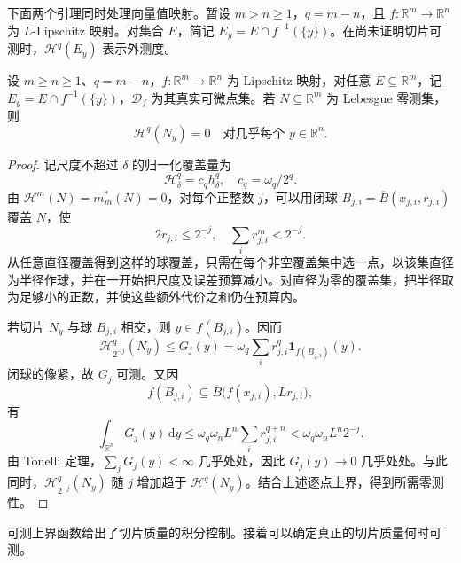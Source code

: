 \ProseParagraphBreak

下面两个引理同时处理向量值映射。暂设 \(m>n\geq1\)，\(q=m-n\)，且 \(f:\mathbb R^m\rightarrow\mathbb R^n\) 为 \(L\)-Lipschitz 映射。对集合 \(E\)，简记 \(E_y=E\cap f^{-1}(\{y\})\)。在尚未证明切片可测时，\(\mathcal H^q(E_y)\) 表示外测度。

\begin{lemma}\label{b1:lem:null-set-slices}
设 \(m\ge n\ge1\)、\(q=m-n\)，\(f:\mathbb R^m\to\mathbb R^n\) 为 Lipschitz 映射，对任意 \(E\subseteq\mathbb R^m\)，记 \(E_y=E\cap f^{-1}(\{y\})\)，\(\mathcal D_f\) 为其真实可微点集。若 \(N\subseteq\mathbb R^m\) 为 Lebesgue 零测集，则
\[
 \mathcal H^q(N_y)=0
 \quad\text{对几乎每个 }y\in\mathbb R^n.
\]
\end{lemma}
\begin{proof}
记尺度不超过 \(\delta\) 的归一化覆盖量为
\[
 \mathcal H^q_\delta=c_qh^q_\delta,
 \quad c_q=\omega_q/2^q.
\]
由 \(\mathcal H^m(N)=m_m^*(N)=0\)，对每个正整数 \(j\)，可以用闭球 \(B_{j,i}=\overline B(x_{j,i},r_{j,i})\) 覆盖 \(N\)，使
\[
 2r_{j,i}\leq2^{-j},\quad \sum_i r_{j,i}^m<2^{-j}.
\]
从任意直径覆盖得到这样的球覆盖，只需在每个非空覆盖集中选一点，以该集直径为半径作球，并在一开始把尺度及误差预算减小。对直径为零的覆盖集，把半径取为足够小的正数，并使这些额外代价之和仍在预算内。

若切片 \(N_y\) 与球 \(B_{j,i}\) 相交，则 \(y\in f(B_{j,i})\)。因而
\[
 \mathcal H^q_{2^{-j}}(N_y)
 \leq G_j(y)=\omega_q\sum_i r_{j,i}^q
                              \mathbf1_{f(B_{j,i})}(y).
\]
闭球的像紧，故 \(G_j\) 可测。又因
\[
 f(B_{j,i})\subseteq
 \overline B\bigl(f(x_{j,i}),Lr_{j,i}\bigr),
\]
有
\[
 \int_{\mathbb R^n}G_j(y)\,\mathrm dy
 \leq\omega_q\omega_n L^n\sum_i r_{j,i}^{q+n}
 <\omega_q\omega_n L^n2^{-j}.
\]
由 Tonelli 定理，\(\sum_jG_j(y)<\infty\) 几乎处处，因此 \(G_j(y)\to0\) 几乎处处。与此同时，\(\mathcal H^q_{2^{-j}}(N_y)\) 随 \(j\) 增加趋于 \(\mathcal H^q(N_y)\)。结合上述逐点上界，得到所需零测性。
\end{proof}

可测上界函数给出了切片质量的积分控制。接着可以确定真正的切片质量何时可测。


